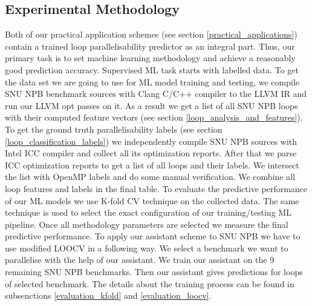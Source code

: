 \documentclass[sigconf,10pt,review,anonymous]{acmart}
\begin{document}
\subsection{Experimental Methodology}
\label{evaluation_methodology}
\quad Both of our practical application schemes (see section \ref{practical_applications}) contain a trained loop parallelisability predictor as an integral part. Thus, our primary task is to set machine learning methodology and achieve a reasonably good prediction accuracy.
\quad Supervised ML task starts with labelled data. To get the data set we are going to use for ML model training and testing, we compile SNU NPB benchmark sources with Clang C/C++ compiler to the LLVM IR and run our LLVM opt passes on it. As a result we get a list of all SNU NPB loops with their computed feature vectors (see section \ref{loop_analysis_and_features}). To get the ground truth parallelisability labels (see section \ref{loop_classification_labels}) we independently compile SNU NPB sources with Intel ICC compiler and collect all its optimization reports. After that we parse ICC optimization reports to get a list of all loops and their labels. We intersect the list with OpenMP labels and do some manual verification. We combine all loop features and labels in the final table.
\quad To evaluate the predictive performance of our ML models we use K-fold CV technique on the collected data. The same technique is used to select the exact configuration of our training/testing ML pipeline. Once all methodology parameters are selected we measure the final predictive performance.\newline\null
\quad To apply our assistant scheme to SNU NPB we have to use modified LOOCV in a following way. We select a benchmark we want to parallelise with the help of our assistant. We train our assistant on the 9 remaining SNU NPB benchmarks. Then our assistant gives predictions for loops of selected benchmark. The details about the training process can be found in subsenctions \ref{evaluation_kfold} and \ref{evaluation_loocv}.
\end{document}
